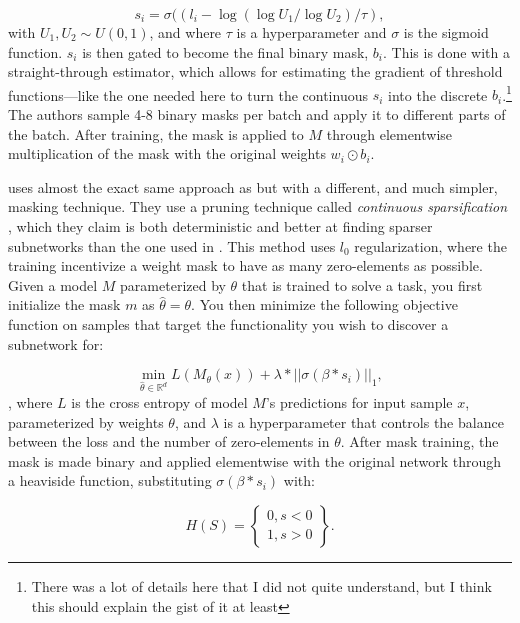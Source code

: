 \documentclass[11pt]{article}
\DeclareMathOperator*{\mini}{min}
\begin{document}
\begin{equation}
s_i = \sigma((l_i - \log(\log U_1 / \log U_2) / \tau),
\end{equation}
with $U_1, U_2 \sim U(0,1)$, and where $\tau$ is a hyperparameter and $\sigma$ is the sigmoid function. $s_i$ is then gated to become the final binary mask, $b_i$. This is done with a straight-through estimator, which allows for estimating the gradient of threshold functions---like the one needed here to turn the continuous $s_i$ into the discrete $b_i$.\footnote{There was a lot of details here that I did not quite understand, but I think this should explain the gist of it at least} The authors sample 4-8 binary masks per batch and apply it to different parts of the batch. After training, the mask is applied to $M$ through elementwise multiplication of the mask with the original weights $w_i \odot b_i$. 

\citet{lepori2023break} uses almost the exact same approach as \citet{csordas2020neural} but with a different, and much simpler, masking technique. They use a pruning technique called \textit{continuous sparsification} \citep{savarese2020winning}, which they claim is both deterministic and better at finding sparser subnetworks than the one used in \citet{csordas2020neural}. This method uses $l_0$ regularization, where the training incentivize a weight mask to have as many zero-elements as possible. Given a model $M$ parameterized by $\theta$ that is trained to solve a task, you first initialize the mask $m$ as $\hat{\theta} = \theta$. You then minimize the following objective function on samples that target the functionality you wish to discover a subnetwork for: 

\begin{equation}
\mini_{\hat{\theta}\in \mathbb{R}^d} L\left(M_\theta(x)\right) + \lambda * ||\sigma(\beta * s_i)||_1,
\end{equation}
, where $L$ is the cross entropy of model $M$'s predictions for input sample $x$, parameterized by weights $\theta$, and $\lambda$ is a hyperparameter that controls the balance between the loss and the number of zero-elements in $\theta$. After mask training, the mask is made binary and applied elementwise with the original network through a heaviside function, substituting $\sigma(\beta * s_i)$ with:

\begin{equation}
    H(S)=
    \left\{
    \begin{array}{lr}
      0,  s < 0 \\
      1,  s > 0
    \end{array}
    \right\}.
\end{equation}
\end{document}
